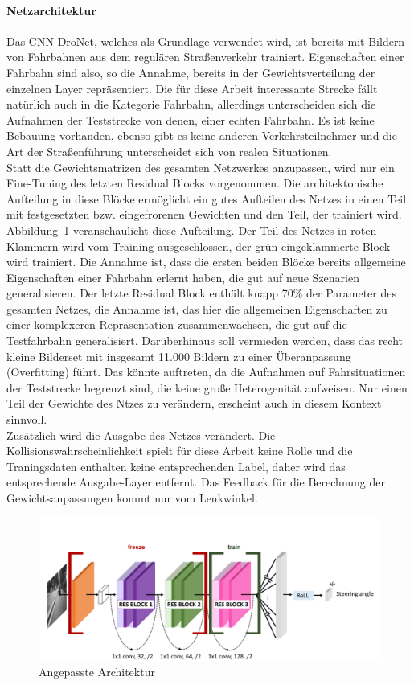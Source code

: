 \paragraph{Netzarchitektur}
Das CNN DroNet, welches als Grundlage verwendet wird, ist bereits mit Bildern von Fahrbahnen aus dem regulären Straßenverkehr trainiert. Eigenschaften einer Fahrbahn sind also, so die Annahme, bereits in der Gewichtsverteilung der einzelnen Layer repräsentiert. Die für diese Arbeit interessante Strecke fällt natürlich auch in die Kategorie Fahrbahn, allerdings unterscheiden sich die Aufnahmen der Teststrecke von denen, einer echten Fahrbahn. Es ist keine Bebauung vorhanden, ebenso gibt es keine anderen Verkehrsteilnehmer und die Art der Straßenführung unterscheidet sich von realen Situationen.\\
Statt die Gewichtsmatrizen des gesamten Netzwerkes anzupassen, wird nur ein Fine-Tuning des letzten Residual Blocks vorgenommen. Die architektonische Aufteilung in diese Blöcke ermöglicht ein gutes Aufteilen des Netzes in einen Teil mit festgesetzten bzw. eingefrorenen Gewichten und den Teil, der trainiert wird.\\
Abbildung~\ref{img:dronetfrozen} veranschaulicht diese Aufteilung. Der Teil des Netzes in roten Klammern wird vom Training ausgeschlossen, der grün eingeklammerte Block wird trainiert. Die Annahme ist, dass die ersten beiden Blöcke bereits allgemeine Eigenschaften einer Fahrbahn erlernt haben, die gut auf neue Szenarien generalisieren. Der letzte Residual Block enthält knapp 70\% der Parameter des gesamten Netzes, die Annahme ist, das hier die allgemeinen Eigenschaften zu einer komplexeren Repräsentation zusammenwachsen, die gut auf die Testfahrbahn generalisiert. Darüberhinaus soll vermieden werden, dass das recht kleine Bilderset mit insgesamt 11.000 Bildern zu einer Überanpassung (Overfitting) führt. Das könnte auftreten, da die Aufnahmen auf Fahrsituationen der Teststrecke begrenzt sind, die keine große Heterogenität aufweisen. Nur einen Teil der Gewichte des Ntzes zu verändern, erscheint auch in diesem Kontext sinnvoll.\\
Zusätzlich wird die Ausgabe des Netzes verändert. Die Kollisionswahrscheinlichkeit spielt für diese Arbeit keine Rolle und die Traningsdaten enthalten keine entsprechenden Label, daher wird das entsprechende Ausgabe-Layer entfernt. Das Feedback für die Berechnung der Gewichtsanpassungen kommt nur vom Lenkwinkel.

\begin{figure}[h]
	\centering
	\includegraphics[scale=0.5]{figures/Architecture-DRONET-FROZEN.png}
	\caption{Angepasste Architektur}
	\label{img:dronetfrozen}
\end{figure}

